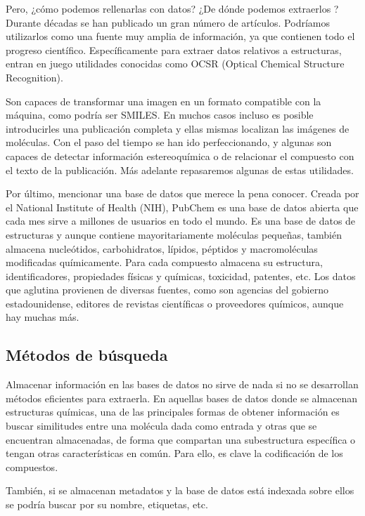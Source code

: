 Pero, ¿cómo podemos rellenarlas con datos? ¿De dónde podemos extraerlos ? Durante décadas se han publicado un gran número de artículos. Podríamos utilizarlos como una fuente muy amplia de información, ya que contienen todo el progreso científico. Específicamente para extraer datos relativos a estructuras, entran en juego utilidades conocidas como OCSR (Optical Chemical Structure Recognition).

Son capaces de transformar una imagen en un formato compatible con la máquina, como podría ser SMILES. En muchos casos incluso es posible introducirles una publicación completa y ellas mismas localizan las imágenes de moléculas. Con el paso del tiempo se han ido perfeccionando, y algunas son capaces de detectar información estereoquímica o de relacionar el compuesto con el texto de la publicación. Más adelante repasaremos algunas de estas utilidades. 

Por último, mencionar una base de datos que merece la pena conocer. Creada por el National Institute of Health (NIH), PubChem es una base de datos abierta que cada mes sirve a millones de usuarios en todo el mundo. Es una base de datos de estructuras y aunque contiene mayoritariamente moléculas pequeñas, también almacena nucleótidos, carbohidratos, lípidos, péptidos y macromoléculas modificadas químicamente. Para cada compuesto almacena su estructura, identificadores, propiedades físicas y químicas, toxicidad, patentes, etc. Los datos que aglutina provienen de diversas fuentes, como son agencias del gobierno estadounidense, editores de revistas científicas o proveedores químicos, aunque hay muchas más. \cite{pubchem}

\subsection{Métodos de búsqueda}
Almacenar información en las bases de datos no sirve de nada si no se desarrollan métodos eficientes para extraerla. En aquellas bases de datos donde se almacenan estructuras químicas, una de las principales formas de obtener información es buscar similitudes entre una molécula dada como entrada y otras que se encuentran almacenadas, de forma que compartan una subestructura específica o tengan otras características en común. Para ello, es clave la codificación de los compuestos.

También, si se almacenan metadatos y la base de datos está indexada sobre ellos se podría buscar por su nombre, etiquetas, etc. \cite{doi:10.1021/ci600234z}

